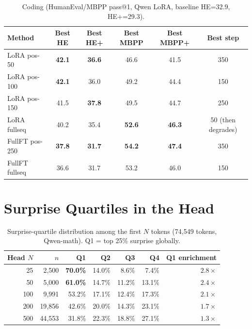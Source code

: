 \documentclass[10pt]{article}
\begin{document}
\begin{table}[h]
\centering
\caption{Coding (HumanEval/MBPP pass@1, Qwen LoRA, baseline HE=32.9, HE+=29.3).}
\small
\begin{tabular}{@{}lccccc@{}}
\toprule
\textbf{Method} & \textbf{Best HE} & \textbf{Best HE+} & \textbf{Best MBPP} & \textbf{Best MBPP+} & \textbf{Best step} \\
\midrule
LoRA pos-50    & \textbf{42.1} & \textbf{36.6} & 46.6 & 41.5 & 350 \\
LoRA pos-100   & \textbf{42.1} & 36.0          & 49.2 & 44.4 & 150 \\
LoRA pos-150   & 41.5          & \textbf{37.8} & 49.5 & 44.7 & 250 \\
LoRA fullseq   & 40.2          & 35.4          & \textbf{52.6} & \textbf{46.3} & 50 (then degrades) \\
\midrule
FullFT pos-250 & \textbf{37.8} & \textbf{31.7} & \textbf{54.2} & \textbf{47.4} & 350 \\
FullFT fullseq & 36.6          & 31.7          & 53.2          & 46.0          & 150 \\
\bottomrule
\end{tabular}
\end{table}

\section{Surprise Quartiles in the Head}
\label{app:surprise}

\begin{table}[h]
\centering
\caption{Surprise-quartile distribution among the first $N$ tokens (74{,}549 tokens, Qwen-math). Q1 = top 25\% surprise globally.}
\small
\begin{tabular}{@{}rrrrrrr@{}}
\toprule
\textbf{Head $N$} & \textbf{$n$} & \textbf{Q1} & \textbf{Q2} & \textbf{Q3} & \textbf{Q4} & \textbf{Q1 enrichment} \\
\midrule
25  &  2{,}500 & \textbf{70.0\%} & 14.0\% &  8.6\% &  7.4\% & $2.8\times$ \\
50  &  5{,}000 & \textbf{61.0\%} & 14.7\% & 11.2\% & 13.1\% & $2.4\times$ \\
100 &  9{,}991 & 53.2\% & 17.1\% & 12.4\% & 17.3\% & $2.1\times$ \\
200 & 19{,}856 & 42.6\% & 20.0\% & 14.3\% & 23.1\% & $1.7\times$ \\
500 & 44{,}553 & 31.8\% & 22.3\% & 18.8\% & 27.1\% & $1.3\times$ \\
\bottomrule
\end{tabular}
\end{table}
\end{document}
